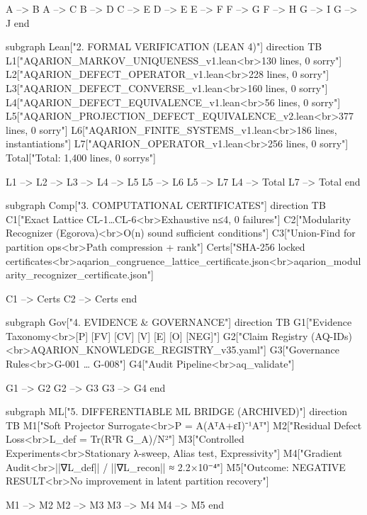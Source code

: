 {{{{{{{{{{{{{        A --> B
        A --> C
        B --> D
        C --> E
        D --> E
        E --> F
        F --> G
        F --> H
        G --> I
        G --> J
    end

    subgraph Lean["2. FORMAL VERIFICATION (LEAN 4)"]
        direction TB
        L1["AQARION_MARKOV_UNIQUENESS_v1.lean<br>130 lines, 0 sorry"]
        L2["AQARION_DEFECT_OPERATOR_v1.lean<br>228 lines, 0 sorry"]
        L3["AQARION_DEFECT_CONVERSE_v1.lean<br>160 lines, 0 sorry"]
        L4["AQARION_DEFECT_EQUIVALENCE_v1.lean<br>56 lines, 0 sorry"]
        L5["AQARION_PROJECTION_DEFECT_EQUIVALENCE_v2.lean<br>377 lines, 0 sorry"]
        L6["AQARION_FINITE_SYSTEMS_v1.lean<br>186 lines, instantiations"]
        L7["AQARION_OPERATOR_v1.lean<br>256 lines, 0 sorry"]
        Total["Total: 1,400 lines, 0 sorrys"]

        L1 --> L2 --> L3 --> L4 --> L5
        L5 --> L6
        L5 --> L7
        L4 --> Total
        L7 --> Total
    end

    subgraph Comp["3. COMPUTATIONAL CERTIFICATES"]
        direction TB
        C1["Exact Lattice CL-1…CL-6<br>Exhaustive n≤4, 0 failures"]
        C2["Modularity Recognizer (Egorova)<br>O(n) sound sufficient conditions"]
        C3["Union-Find for partition ops<br>Path compression + rank"]
        Certs["SHA-256 locked certificates<br>aqarion_congruence_lattice_certificate.json<br>aqarion_modularity_recognizer_certificate.json"]

        C1 --> Certs
        C2 --> Certs
    end

    subgraph Gov["4. EVIDENCE & GOVERNANCE"]
        direction TB
        G1["Evidence Taxonomy<br>[P] [FV] [CV] [V] [E] [O] [NEG]"]
        G2["Claim Registry (AQ-IDs)<br>AQARION_KNOWLEDGE_REGISTRY_v35.yaml"]
        G3["Governance Rules<br>G-001 … G-008"]
        G4["Audit Pipeline<br>aq_validate"]

        G1 --> G2
        G2 --> G3
        G3 --> G4
    end

    subgraph ML["5. DIFFERENTIABLE ML BRIDGE (ARCHIVED)"]
        direction TB
        M1["Soft Projector Surrogate<br>P = A(AᵀA+εI)⁻¹Aᵀ"]
        M2["Residual Defect Loss<br>L_def = Tr(RᵀR G_A)/N²"]
        M3["Controlled Experiments<br>Stationary λ-sweep, Alias test, Expressivity"]
        M4["Gradient Audit<br>||∇L_def|| / ||∇L_recon|| ≈ 2.2×10⁻⁴"]
        M5["Outcome: NEGATIVE RESULT<br>No improvement in latent partition recovery"]

        M1 --> M2
        M2 --> M3
        M3 --> M4
        M4 --> M5
    end

}}}}}}}}}}}}}
